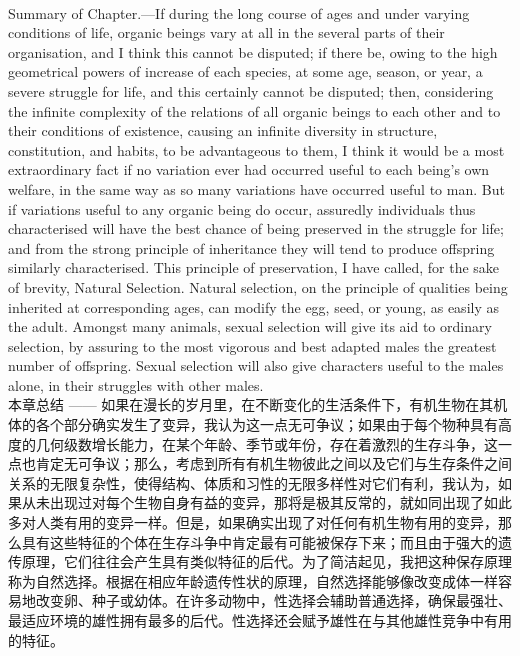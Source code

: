 \documentclass{article}
\begin{document}
\\
Summary of Chapter.—If during the long course of ages and under varying conditions of life, organic beings vary at all in the several parts of their organisation, and I think this cannot be disputed; if there be, owing to the high geometrical powers of increase of each species, at some age, season, or year, a severe struggle for life, and this certainly cannot be disputed; then, considering the infinite complexity of the relations of all organic beings to each other and to their conditions of existence, causing an infinite diversity in structure, constitution, and habits, to be advantageous to them, I think it would be a most extraordinary fact if no variation ever had occurred useful to each being’s own welfare, in the same way as so many variations have occurred useful to man. But if variations useful to any organic being do occur, assuredly individuals thus characterised will have the best chance of being preserved in the struggle for life; and from the strong principle of inheritance they will tend to produce offspring similarly characterised. This principle of preservation, I have called, for the sake of brevity, Natural Selection. Natural selection, on the principle of qualities being inherited at corresponding ages, can modify the egg, seed, or young, as easily as the adult. Amongst many animals, sexual selection will give its aid to ordinary selection, by assuring to the most vigorous and best adapted males the greatest number of offspring. Sexual selection will also give characters useful to the males alone, in their struggles with other males.\\
本章总结 —— 如果在漫长的岁月里，在不断变化的生活条件下，有机生物在其机体的各个部分确实发生了变异，我认为这一点无可争议；如果由于每个物种具有高度的几何级数增长能力，在某个年龄、季节或年份，存在着激烈的生存斗争，这一点也肯定无可争议；那么，考虑到所有有机生物彼此之间以及它们与生存条件之间关系的无限复杂性，使得结构、体质和习性的无限多样性对它们有利，我认为，如果从未出现过对每个生物自身有益的变异，那将是极其反常的，就如同出现了如此多对人类有用的变异一样。但是，如果确实出现了对任何有机生物有用的变异，那么具有这些特征的个体在生存斗争中肯定最有可能被保存下来；而且由于强大的遗传原理，它们往往会产生具有类似特征的后代。为了简洁起见，我把这种保存原理称为自然选择。根据在相应年龄遗传性状的原理，自然选择能够像改变成体一样容易地改变卵、种子或幼体。在许多动物中，性选择会辅助普通选择，确保最强壮、最适应环境的雄性拥有最多的后代。性选择还会赋予雄性在与其他雄性竞争中有用的特征。 \\
\end{document}
